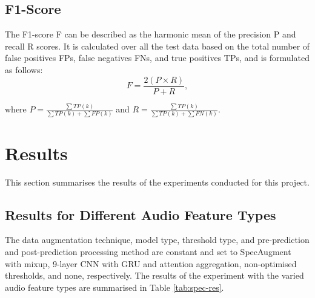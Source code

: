 \subsection{F1-Score}
The F1-score F can be described as the harmonic mean of the precision P and recall R scores. It is calculated over all the test data based on the total number of false positives FPs, false negatives FNs, and true positives TPs, and is formulated as follows:
\begin{equation}
F = \frac{2(P \times R)}{P + R},
\end{equation}

where \(P = \frac{\sum{TP(k)}}{\sum{TP(k)} + \sum{FP(k)}}\) and \(R = \frac{\sum{TP(k)}}{\sum{TP(k)} + \sum{FN(k)}}\).

\section{Results}

This section summarises the results of the experiments conducted for this project.

\subsection{Results for Different Audio Feature Types}
The data augmentation technique, model type, threshold type, and pre-prediction and post-prediction processing method are constant and set to SpecAugment with mixup, 9-layer CNN with GRU and attention aggregation, non-optimised thresholds, and none, respectively. The results of the experiment with the varied audio feature types are summarised in Table \ref{tab:spec-res}.

